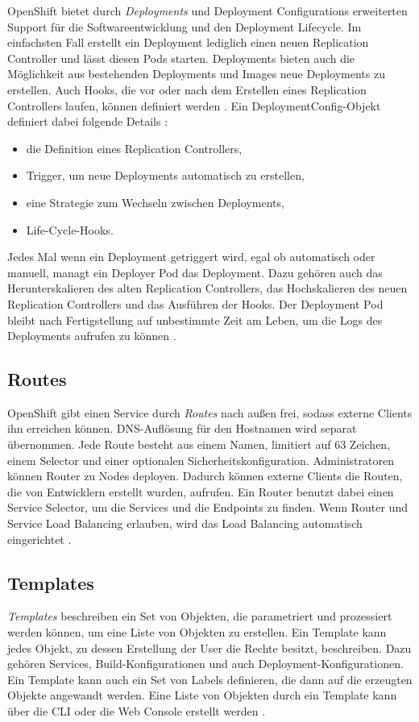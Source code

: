 OpenShift bietet durch \textit{Deployments} und Deployment Configurations erweiterten Support für die Softwareentwicklung und den Deployment Lifecycle. Im einfachsten Fall erstellt ein Deployment lediglich einen neuen Replication Controller und lässt diesen Pods starten. Deployments bieten auch die Möglichkeit aus bestehenden Deployments und Images neue Deployments zu erstellen. Auch Hooks, die vor oder nach dem Erstellen eines Replication Controllers laufen, können definiert werden \cite{OpenShiftOnline}.
Ein DeploymentConfig-Objekt definiert dabei folgende Details \cite{OpenShiftOnline}:
\begin{itemize}
	\item die Definition eines Replication Controllers,
	\item Trigger, um neue Deployments automatisch zu erstellen,
	\item eine Strategie zum Wechseln zwischen Deployments,
	\item Life-Cycle-Hooks.
\end{itemize}
Jedes Mal wenn ein Deployment getriggert wird, egal ob automatisch oder manuell, managt ein Deployer Pod das Deployment. Dazu gehören auch das Herunterskalieren des alten Replication Controllers, das Hochskalieren des neuen Replication Controllers und das Ausführen der Hooks.
Der Deployment Pod bleibt nach Fertigstellung auf unbestimmte Zeit am Leben, um die Logs des Deployments aufrufen zu können \cite{OpenShiftOnline}. 

\subsection{Routes}
OpenShift gibt einen Service durch \textit{Routes} nach außen frei, sodass externe Clients ihn erreichen können. DNS-Auflösung für den Hostnamen wird separat übernommen. Jede Route besteht aus einem Namen, limitiert auf 63 Zeichen, einem Selector und einer optionalen Sicherheitskonfiguration.
Administratoren können Router zu Nodes deployen. Dadurch können externe Clients die Routen, die von Entwicklern erstellt wurden, aufrufen. Ein Router benutzt dabei einen Service Selector, um die Services und die Endpoints zu finden. Wenn Router und Service Load Balancing erlauben, wird das Load Balancing automatisch eingerichtet \cite{OpenShiftOnline}.

\subsection{Templates}
\textit{Templates} beschreiben ein Set von Objekten, die parametriert und prozessiert werden können, um eine Liste von Objekten zu erstellen. Ein Template kann jedes Objekt, zu dessen Erstellung der User die Rechte besitzt, beschreiben. Dazu gehören Services, Build-Konfigurationen und auch Deployment-Konfigurationen. Ein Template kann auch ein Set von Labels definieren, die dann auf die erzeugten Objekte angewandt werden.
Eine Liste von Objekten durch ein Template kann über die CLI oder die Web Console erstellt werden \cite{OpenShiftOnline}. 
